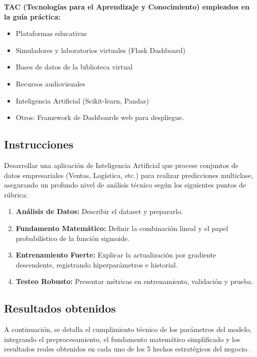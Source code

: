 \documentclass{article}
\begin{document}
\textbf{TAC (Tecnologías para el Aprendizaje y Conocimiento) empleados en la guía práctica:}
\begin{itemize}
    \item[$\blacksquare$] Plataformas educativas
    \item[$\blacksquare$] Simuladores y laboratorios virtuales (Flask Dashboard)
    \item[$\blacksquare$] Bases de datos de la biblioteca virtual
    \item[$\square$] Recursos audiovisuales
    \item[$\blacksquare$] Inteligencia Artificial (Scikit-learn, Pandas)
    \item Otros: Framework de Dashboards web para despliegue. 
\end{itemize}

\subsection{Instrucciones}
Desarrollar una aplicación de Inteligencia Artificial que procese conjuntos de datos empresariales (Ventas, Logística, etc.) para realizar predicciones multiclase, asegurando un profundo nivel de análisis técnico según los siguientes puntos de rúbrica:
\begin{enumerate}
    \item \textbf{Análisis de Datos:} Describir el dataset y prepararlo.
    \item \textbf{Fundamento Matemático:} Definir la combinación lineal y el papel probabilístico de la función sigmoide.
    \item \textbf{Entrenamiento Fuerte:} Explicar la actualización por gradiente descendente, registrando hiperparámetros e historial.
    \item \textbf{Testeo Robusto:} Presentar métricas en entrenamiento, validación y prueba.
\end{enumerate}

\subsection{Resultados obtenidos}
A continuación, se detalla el cumplimiento técnico de los parámetros del modelo, integrando el preprocesamiento, el fundamento matemático simplificado y los resultados reales obtenidos en cada uno de los 5 hechos estratégicos del negocio.
\end{document}
